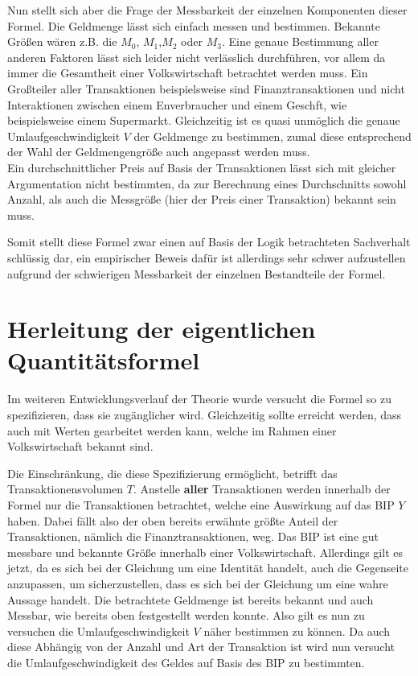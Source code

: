 Nun stellt sich aber die Frage der Messbarkeit der einzelnen Komponenten dieser Formel. Die Geldmenge lässt sich einfach messen und bestimmen. Bekannte Größen wären z.B. die $M_0$, $M_1$,$M_2$ oder $M_3$. Eine genaue Bestimmung aller anderen Faktoren lässt sich leider nicht verlässlich durchführen, vor allem da immer die Gesamtheit einer Volkswirtschaft betrachtet werden muss. Ein Großteiler aller Transaktionen beispielsweise sind Finanztransaktionen und nicht Interaktionen zwischen einem Enverbraucher und einem Geschft, wie beispielsweise einem Supermarkt. Gleichzeitig ist es quasi unmöglich die genaue Umlaufgeschwindigkeit $V$ der Geldmenge zu bestimmen, zumal diese entsprechend der Wahl der Geldmengengröße auch angepasst werden muss. \\
Ein durchschnittlicher Preis auf Basis der Transaktionen lässt sich mit gleicher Argumentation nicht bestimmten, da zur Berechnung eines Durchschnitts sowohl Anzahl, als auch die Messgröße (hier der Preis einer Transaktion) bekannt sein muss.

Somit stellt diese Formel zwar einen auf Basis der Logik betrachteten Sachverhalt schlüssig dar, ein empirischer Beweis dafür ist allerdings sehr schwer aufzustellen aufgrund der schwierigen Messbarkeit der einzelnen Bestandteile der Formel.

\section{Herleitung der eigentlichen Quantitätsformel}

Im weiteren Entwicklungsverlauf der Theorie wurde versucht die Formel so zu spezifizieren, dass sie zugänglicher wird. Gleichzeitig sollte erreicht werden, dass auch mit Werten gearbeitet werden kann, welche im Rahmen einer Volkswirtschaft bekannt sind.

Die Einschränkung, die diese Spezifizierung ermöglicht, betrifft das Transaktionensvolumen $T$. Anstelle \textbf{aller} Transaktionen werden innerhalb der Formel nur die Transaktionen betrachtet, welche eine Auswirkung auf das BIP $Y$ haben. Dabei fällt also der oben bereits erwähnte größte Anteil der Transaktionen, nämlich die Finanztransaktionen, weg. Das BIP ist eine gut messbare und bekannte Größe innerhalb einer Volkswirtschaft. Allerdings gilt es jetzt, da es sich bei der Gleichung um eine Identität handelt, auch die Gegenseite anzupassen, um sicherzustellen, dass es sich bei der Gleichung um eine wahre Aussage handelt. Die betrachtete Geldmenge ist bereits bekannt und auch Messbar, wie bereits oben festgestellt werden konnte. Also gilt es nun zu versuchen die Umlaufgeschwindigkeit $V$ näher bestimmen zu können. Da auch diese Abhängig von der Anzahl und Art der Transaktion ist wird nun versucht die Umlaufgeschwindigkeit des Geldes auf Basis des BIP zu bestimmten.

